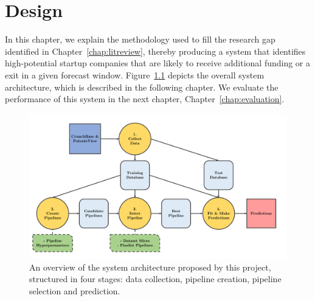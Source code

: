 \documentclass[../thesis/thesis.tex]{subfiles}
\begin{document}
\chapter{Design}
\label{chap:design}

In this chapter, we explain the methodology used to fill the research gap identified in Chapter~\ref{chap:litreview}, thereby producing a system that identifies high-potential startup companies that are likely to receive additional funding or a exit in a given forecast window. Figure~\ref{fig:design:system_architecture} depicts the overall system architecture, which is described in the following chapter. We evaluate the performance of this system in the next chapter, Chapter~\ref{chap:evaluation}.

\begin{figure}[!htb] %
    \centering
    \includegraphics[width=\textwidth]{../figures/design/flowchart_overview}
    \caption[System architecture flowchart]{An overview of the system architecture proposed by this project, structured in four stages: data collection, pipeline creation, pipeline selection and prediction.}
    \label{fig:design:system_architecture}
\end{figure}
\end{document}
